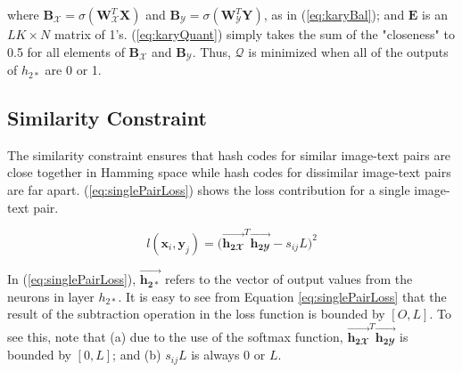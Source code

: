 \documentclass[letterpaper]{article}
\newcommand{\bpx}{\mathbf{B_\mathcal{X}}}
\newcommand{\bpy}{\mathbf{B_\mathcal{Y}}}
\newcommand{\WX}{\mathbf{W}_\mathcal{X}}
\newcommand{\WY}{\mathbf{W}_\mathcal{Y}}
\newcommand{\X}{\mathbf{X}}
\newcommand{\Y}{\mathbf{Y}}
\newcommand{\htwoxv}{\vec{\mathbf{h_{2\mathbfcal{X}}}}}
\newcommand{\htwoyv}{\vec{\mathbf{h_{2\mathbfcal{Y}}}}}
\newcommand{\xii}{\mathbf{x}_i}
\newcommand{\yj}{\mathbf{y}_j}
\begin{document}
\noindent where $ \bpx = \sigma(\WX^T\X) $ and $ \bpy = \sigma(\WY^T\Y) $, as in (\ref{eq:karyBal}); and $ \mathbf{E} $ is an $ LK \times N $ matrix of 1's. (\ref{eq:karyQuant}) simply takes the sum of the "closeness" to 0.5 for all elements of $ \bpx $ and $ \bpy $. Thus, $ \mathcal{Q} $ is minimized when all of the outputs of $ h_{2*} $ are 0 or 1.

\subsection{Similarity Constraint}

The similarity constraint ensures that hash codes for similar image-text pairs are close together in Hamming space while hash codes for dissimilar image-text pairs are far apart. (\ref{eq:singlePairLoss}) shows the loss contribution for a single image-text pair.

\begin{equation}
\label{eq:singlePairLoss}
l(\xii,\yj) = \big( \htwoxv^T \htwoyv - s_{ij}L \big)^2
\end{equation}

In (\ref{eq:singlePairLoss}), $ \vec{\mathbf{h_{2*}}} $ refers to the vector of output values from the neurons in layer $ h_{2*} $. It is easy to see from Equation \ref{eq:singlePairLoss} that the result of the subtraction operation in the loss function is bounded by $ [O, L] $. To see this, note that (a) due to the use of the softmax function, $ \htwoxv^T \htwoyv $ is bounded by $ [\text{0}, L] $; and (b) $ s_{ij}L $ is always 0 or $ L $.

\begin{comment}
In (\ref{eq:singlePairLoss}), $ L $ is the number of bits in the hash code, and $ \vec{\mathbf{h_{2*}}} $ refers to the vector of output values from the neurons in layer $ h_{2*} $. $ s_{ij} $ refers to the similarity between image $ \xii $ and text $ \yj $, and is given in (\ref{eq:sij}):

\begin{equation}
\label{eq:sij}
s_{ij} = 
 \begin{cases} 
      1, & \xii~ \text{and}~ \yj~ \text{are similar} \\
      0, & \xii~ \text{and}~ \yj~ \text{are not similar}
   \end{cases}
\end{equation}

An image-text pair is said to be similar if they share at least one common concept, i.e. class label. If the image and text do not have any common class labels, the pair is said to be dissimilar. It is easy to see from Equation \ref{eq:singlePairLoss} that the result of the subtraction operation in the loss function is bounded by $ [O, L] $. To see this, note that (a) due to the use of the softmax function, $ \htwoxv^T \htwoyv $ is bounded by $ [O, L] $; and (b) $ s_{ij}L $ is always 0 or $ L $.
\end{comment}
\end{document}
